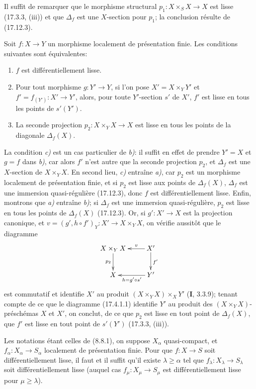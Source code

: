 Il suffit de remarquer que le morphisme structural $p_1:X\times_SX\to X$ est lisse (17.3.3, (iii)) et que $\Delta_f$ est une $X$-section pour $p_1$; la conclusion résulte de (17.12.3).

\begin{proposition}[17.12.5]
\label{IV.17.12.5}
Soit $f:X\to Y$ un morphisme localement de présentation finie. Les conditions suivantes sont équivalentes:
\begin{enumerate}
  \item[\textup{a)}] $f$ est différentiellement lisse.
  \item[\textup{b)}] Pour tout morphisme $g:Y'\to Y$, si l'on pose $X'=X\times_Y Y'$ et $f'=f_{(Y')}:X'\to Y'$, alors, pour toute $Y'$-section $s'$ de $X'$, $f'$ est lisse en tous les points de $s'(Y')$.
  \item[\textup{c)}] La seconde projection $p_2:X\times_YX\to X$ est lisse en tous les points de la diagonale $\Delta_f(X)$.
\end{enumerate}
\end{proposition}


La condition \emph{c)} est un cas particulier de \emph{b)}: il suffit en effet de prendre $Y'=X$ et $g=f$ dans \emph{b)}, car alors $f'$ n'est autre que la seconde projection $p_2$, et $\Delta_f$ est une $X$-section de $X\times_YX$. En second lieu, \emph{c)} entraîne \emph{a)}, car $p_2$ est un morphisme localement de présentation finie, et si $p_2$ est lisse aux points de $\Delta_f(X)$, $\Delta_f$ est une immersion quasi-régulière (17.12.3), donc $f$ est différentiellement lisse. Enfin, montrons que \emph{a)} entraîne \emph{b)}; si $\Delta_f$ est une immersion quasi-régulière, $p_2$ est lisse en tous les points de $\Delta_f(X)$ (17.12.3).
Or, si $g':X'\to X$ est la projection canonique, et $v=(g',h\circ f')_Y:X'\to X\times_YX$, on vérifie aussitôt que le diagramme
\[
\xymatrix{
  X\times_Y X \ar[d]_{p_2} & X' \ar[l]_-v \ar[d]^{f'}\\
  X & Y' \ar[l]^{h=g'\circ s'}
}
\]
est commutatif et identifie $X'$ au produit $(X\times_YX)\times_XY'$ (\textbf{I}, 3.3.9); tenant compte de ce que le diagramme (17.4.1.1) identifie $Y'$ au produit des $(X\times_YX)$-préschémas $X$ et $X'$, on conclut, de ce que $p_2$ est lisse en tout point de $\Delta_f(X)$, que $f'$ est lisse en tout point de $s'(Y')$ (17.3.3, (iii)).

\begin{corollary}[17.12.6]
\label{IV.17.12.6}
Les notations étant celles de \textup{(8.8.1)}, on suppose $X_\alpha$ quasi-compact, et $f_\alpha:X_\alpha\to S_\alpha$ localement de présentation finie. Pour que $f:X\to S$ soit différentiellement lisse, il faut et il suffit qu'il existe $\lambda\geq\alpha$ tel que $f_\lambda:X_\lambda\to S_\lambda$ soit différentiellement lisse \textup{(}auquel cas $f_\mu:X_\mu\to S_\mu$ est différentiellement lisse pour $\mu\geq\lambda$\textup{)}.
\end{corollary}

